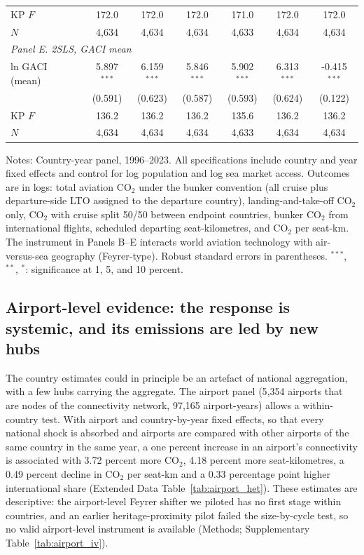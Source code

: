 \documentclass[12pt]{article}
\begin{document}
\begin{table}[htbp]
\begin{threeparttable}
\begin{tabular}{lcccccc}
  KP $F$ & 172.0 & 172.0 & 172.0 & 171.0 & 172.0 & 172.0 \\
  $N$ & 4,634 & 4,634 & 4,634 & 4,633 & 4,634 & 4,634 \\
\midrule
\multicolumn{7}{l}{\textit{Panel E. 2SLS, GACI mean}} \\
  ln GACI (mean) & 5.897$^{***}$ & 6.159$^{***}$ & 5.846$^{***}$ & 5.902$^{***}$ & 6.313$^{***}$ & -0.415$^{***}$ \\
   & (0.591) & (0.623) & (0.587) & (0.593) & (0.624) & (0.122) \\
  KP $F$ & 136.2 & 136.2 & 136.2 & 135.6 & 136.2 & 136.2 \\
  $N$ & 4,634 & 4,634 & 4,634 & 4,633 & 4,634 & 4,634 \\
\bottomrule
\end{tabular}
\begin{tablenotes}[flushleft]
\footnotesize
\item Notes: Country-year panel, 1996--2023. All specifications include country and year fixed effects and control for log population and log sea market access. Outcomes are in logs: total aviation CO$_2$ under the bunker convention (all cruise plus departure-side LTO assigned to the departure country), landing-and-take-off CO$_2$ only, CO$_2$ with cruise split 50/50 between endpoint countries, bunker CO$_2$ from international flights, scheduled departing seat-kilometres, and CO$_2$ per seat-km. The instrument in Panels B--E interacts world aviation technology with air-versus-sea geography (Feyrer-type). Robust standard errors in parentheses. $^{***}$, $^{**}$, $^{*}$: significance at 1, 5, and 10 percent.
\end{tablenotes}
\end{threeparttable}
\end{table}

\subsection*{Airport-level evidence: the response is systemic, and its
emissions are led by new hubs}
The country estimates could in principle be an artefact of national
aggregation, with a few hubs carrying the aggregate. The airport panel
(5{,}354 airports that are nodes of the connectivity network, 97{,}165
airport-years) allows a within-country test. With airport and
country-by-year fixed effects, so that every national shock is absorbed and
airports are compared with other airports of the same country in the same
year, a one percent increase in an airport's connectivity is associated
with 3.72 percent more CO$_2$, 4.18 percent more seat-kilometres, a 0.49
percent decline in CO$_2$ per seat-km and a 0.33 percentage point higher
international share (Extended Data Table~\ref{tab:airport_het}). These
estimates are descriptive: the airport-level Feyrer shifter we piloted has
no first stage within countries, and an earlier heritage-proximity pilot
failed the size-by-cycle test, so no valid airport-level instrument is
available (Methods; Supplementary Table~\ref{tab:airport_iv}).
\end{document}
